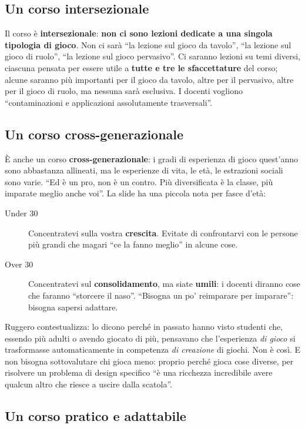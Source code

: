 \subsection{Un corso intersezionale}

Il corso è \textbf{intersezionale}: \textbf{non ci sono lezioni dedicate a una
singola tipologia di gioco}. Non ci sarà ``la lezione sul gioco da tavolo'',
``la lezione sul gioco di ruolo'', ``la lezione sul gioco pervasivo''. Ci saranno
lezioni su temi diversi, ciascuna pensata per essere utile a \textbf{tutte e tre
le sfaccettature} del corso; alcune saranno più importanti per il gioco da
tavolo, altre per il pervasivo, altre per il gioco di ruolo, ma nessuna sarà
esclusiva. I docenti vogliono ``contaminazioni e applicazioni assolutamente
trasversali''.

\subsection{Un corso cross-generazionale}

È anche un corso \textbf{cross-generazionale}: i gradi di esperienza di gioco
quest'anno sono abbastanza allineati, ma le esperienze di vita, le età, le
estrazioni sociali sono varie. ``Ed è un pro, non è un contro. Più diversificata
è la classe, più imparate meglio anche voi''. La slide ha una piccola nota per
fasce d'età:
\begin{description}
  \item[Under 30] Concentratevi sulla vostra \textbf{crescita}. Evitate di
        confrontarvi con le persone più grandi che magari ``ce la fanno meglio''
        in alcune cose.
  \item[Over 30] Concentratevi sul \textbf{consolidamento}, ma siate
        \textbf{umili}: i docenti diranno cose che faranno ``storcere il naso''.
        ``Bisogna un po' reimparare per imparare'': bisogna sapersi adattare.
\end{description}
Ruggero contestualizza: lo dicono perché in passato hanno visto studenti che,
essendo più adulti o avendo giocato di più, pensavano che l'esperienza
\emph{di gioco} si trasformasse automaticamente in competenza \emph{di
creazione} di giochi. Non è così. E non bisogna sottovalutare chi gioca meno:
proprio perché gioca cose diverse, per risolvere un problema di design specifico
``è una ricchezza incredibile avere qualcun altro che riesce a uscire dalla
scatola''.

\subsection{Un corso pratico e adattabile}


